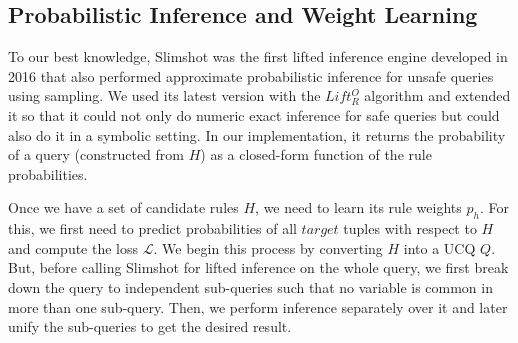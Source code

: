 \documentclass[akbc,twoside,11pt]{article}
\newcounter{example}
\newenvironment{example}[1][]{\refstepcounter{example}\par\medskip\noindent
   \textbf{Example~\theexample #1} \rmfamily}{\medskip}
\newcommand{\arcchit}[1]{\textcolor{blue}{A: {#1}}}
\newcommand{\guy}[1]{\textcolor{red}{G: {#1}}}
\begin{document}

\subsection{Probabilistic Inference and Weight Learning} \label{sub:q} To our best knowledge, Slimshot \cite{DBLP:journals/pvldb/GribkoffS16} was the first lifted inference engine developed in 2016 that also performed approximate probabilistic inference for unsafe queries using sampling. We used its latest version \cite{SafeSample} with the $Lift^O_R$ algorithm and extended it so that it could not only do numeric exact inference for safe queries but could also do it in a symbolic setting. In our implementation, it returns the probability of a query (constructed from $H$) as a closed-form function of the rule probabilities.

Once we have a set of candidate rules $H$, we need to learn its rule weights $p_h$. For this, we first need to predict probabilities of all $target$ tuples with respect to $H$ and compute the loss $\mathcal{L}$. We begin this process by converting $H$ into a UCQ $Q$. But, before calling Slimshot for lifted inference on the whole query, we first break down the query to independent sub-queries such that no variable is common in more than one sub-query.
Then, we perform inference separately over it and later unify the sub-queries to get the desired result.
\end{document}
